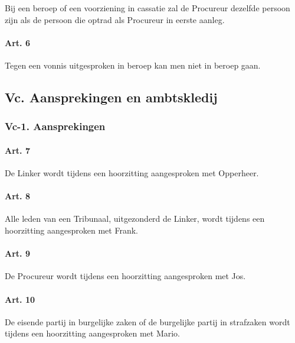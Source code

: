 Bij een beroep of een voorziening in cassatie zal de Procureur dezelfde
persoon zijn als de persoon die optrad als Procureur in eerste aanleg.

\hypertarget{art.-6}{%
\paragraph{Art. 6}\label{art.-6}}

Tegen een vonnis uitgesproken in beroep kan men niet in beroep gaan.

\hypertarget{vc.-aansprekingen-en-ambtskledij}{%
\subsection{Vc. Aansprekingen en
ambtskledij}\label{vc.-aansprekingen-en-ambtskledij}}

\hypertarget{vc-1.-aansprekingen}{%
\subsubsection{Vc-1. Aansprekingen}\label{vc-1.-aansprekingen}}

\hypertarget{art.-7}{%
\paragraph{Art. 7}\label{art.-7}}

De Linker wordt tijdens een hoorzitting aangesproken met Opperheer.

\hypertarget{art.-8}{%
\paragraph{Art. 8}\label{art.-8}}

Alle leden van een Tribunaal, uitgezonderd de Linker, wordt tijdens een
hoorzitting aangesproken met Frank.

\hypertarget{art.-9}{%
\paragraph{Art. 9}\label{art.-9}}

De Procureur wordt tijdens een hoorzitting aangesproken met Jos.

\hypertarget{art.-10}{%
\paragraph{Art. 10}\label{art.-10}}

De eisende partij in burgelijke zaken of de burgelijke partij in
strafzaken wordt tijdens een hoorzitting aangesproken met Mario.

